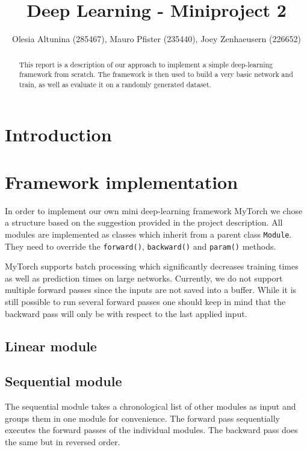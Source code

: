 \documentclass[10pt,conference,compsocconf]{IEEEtran}
\begin{document}
\title{Deep Learning - Miniproject 2}

\author{
  Olesia Altunina (285467), Mauro Pfister (235440), Joey Zenhaeusern (226652)
}

\maketitle

\begin{abstract}
This report is a description of our approach to implement a simple deep-learning framework from scratch. The framework is then used to build a very basic network and train, as well as evaluate it on a randomly generated dataset.
\end{abstract}

\section{Introduction}

\section{Framework implementation}
In order to implement our own mini deep-learning framework MyTorch we chose a structure based on the suggestion provided in the project description. All modules are implemented as classes which inherit from a parent class \texttt{Module}. They need to override the \texttt{forward()}, \texttt{backward()} and \texttt{param()} methods.

MyTorch supports batch processing which significantly decreases training times as well as prediction times on large networks. Currently, we do not support multiple forward passes since the inputs are not saved into a buffer. While it is still possible to run several forward passes one should keep in mind that the backward pass will only be with respect to the last applied input.

\subsection{Linear module}

\subsection{Sequential module}
The sequential module takes a chronological list of other modules as input and groups them in one module for convenience. The forward pass sequentially executes the forward passes of the individual modules. The backward pass does the same but in reversed order.
\end{document}
